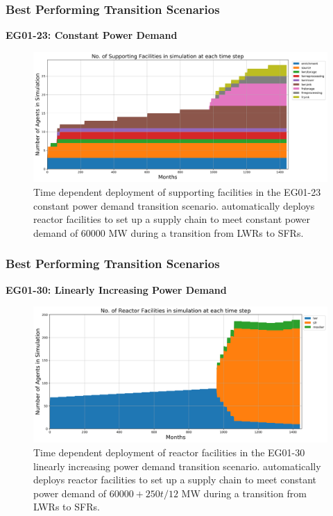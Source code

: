 \begin{frame}
    \frametitle{Best Performing Transition Scenarios}
    \textbf{EG01-23: Constant Power Demand}
    \begin{figure}[htbp!]
        \begin{center}
          \includegraphics[width=\textwidth]{../paper/figures/eg23-stack_support.png}
        \end{center}
              \caption{Time dependent deployment of supporting facilities in 
              the EG01-23 constant power demand transition scenario. 
              \deploy automatically deploys reactor facilities 
              to set up a supply chain to meet constant power demand of $60000$ MW
              during a transition from \glspl{LWR} to \glspl{SFR}.}
      \end{figure}
\end{frame}

\begin{frame}
    \frametitle{Best Performing Transition Scenarios}
    \textbf{EG01-30: Linearly Increasing Power Demand}
    \begin{figure}[htbp!]
        \begin{center}
          \includegraphics[width=\textwidth]{../paper/figures/eg30-stack_reactor.png}
        \end{center}
              \caption{Time dependent deployment of reactor facilities in 
              the EG01-30 linearly increasing power demand transition scenario. 
              \deploy automatically deploys reactor facilities 
              to set up a supply chain to meet constant power demand of $60000+250t/12$ MW
              during a transition from \glspl{LWR} to \glspl{SFR}.}
      \end{figure}
\end{frame}

